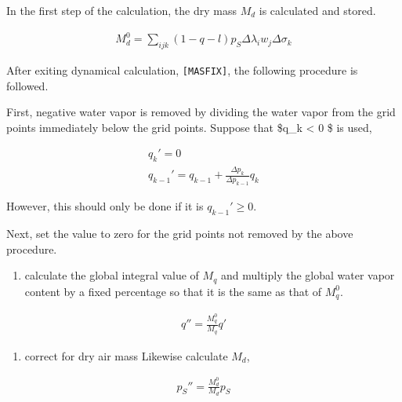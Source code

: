 In the first step of the calculation, the dry mass \(M_d\) is calculated
and stored.

\begin{eqnarray}
  M_d^0 = \sum_{ijk} (1-q-l) p_S \Delta\lambda_i w_j \Delta\sigma_k
\end{eqnarray}

After exiting dynamical calculation, \texttt{{[}MASFIX{]}}, the
following procedure is followed.

First, negative water vapor is removed by dividing the water vapor from
the grid points immediately below the grid points. Suppose that \$q\_k
\textless{} 0 \$ is used,

\begin{eqnarray}
        q_k'      =  0          \\
        q_{k-1}'  =  q_{k-1} + \frac{\Delta p_k}{\Delta p_{k-1}} q_k
\end{eqnarray}

However, this should only be done if it is \(q_{k-1}' \ge 0\).

Next, set the value to zero for the grid points not removed by the above
procedure.

\begin{enumerate}
\def\labelenumi{\arabic{enumi}.}
\setcounter{enumi}{2}
\tightlist
\item
  calculate the global integral value of \(M_q\) and multiply the global
  water vapor content by a fixed percentage so that it is the same as
  that of \(M_q^0\).
\end{enumerate}

\begin{eqnarray}
        q'' = \frac{M_q^0}{M_q} q'
\end{eqnarray}

\begin{enumerate}
\def\labelenumi{\arabic{enumi}.}
\setcounter{enumi}{3}
\tightlist
\item
  correct for dry air mass Likewise calculate \(M_d\),
\end{enumerate}

\begin{eqnarray}
        p_S'' = \frac{M_d^0}{M_d} p_S
\end{eqnarray}
